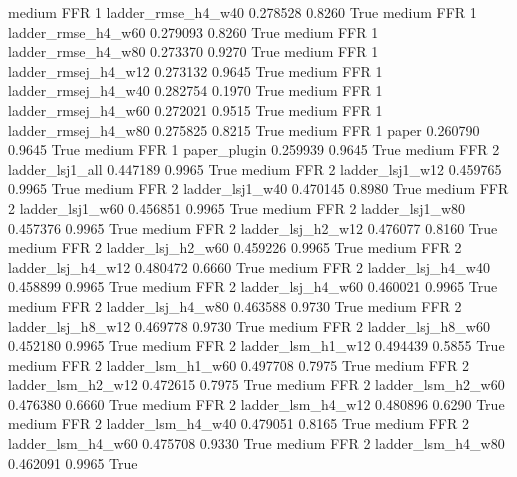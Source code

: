     medium      FFR                 1  ladder_rmse_h4_w40   0.278528      0.8260    True
    medium      FFR                 1  ladder_rmse_h4_w60   0.279093      0.8260    True
    medium      FFR                 1  ladder_rmse_h4_w80   0.273370      0.9270    True
    medium      FFR                 1 ladder_rmsej_h4_w12   0.273132      0.9645    True
    medium      FFR                 1 ladder_rmsej_h4_w40   0.282754      0.1970    True
    medium      FFR                 1 ladder_rmsej_h4_w60   0.272021      0.9515    True
    medium      FFR                 1 ladder_rmsej_h4_w80   0.275825      0.8215    True
    medium      FFR                 1               paper   0.260790      0.9645    True
    medium      FFR                 1        paper_plugin   0.259939      0.9645    True
    medium      FFR                 2     ladder_lsj1_all   0.447189      0.9965    True
    medium      FFR                 2     ladder_lsj1_w12   0.459765      0.9965    True
    medium      FFR                 2     ladder_lsj1_w40   0.470145      0.8980    True
    medium      FFR                 2     ladder_lsj1_w60   0.456851      0.9965    True
    medium      FFR                 2     ladder_lsj1_w80   0.457376      0.9965    True
    medium      FFR                 2   ladder_lsj_h2_w12   0.476077      0.8160    True
    medium      FFR                 2   ladder_lsj_h2_w60   0.459226      0.9965    True
    medium      FFR                 2   ladder_lsj_h4_w12   0.480472      0.6660    True
    medium      FFR                 2   ladder_lsj_h4_w40   0.458899      0.9965    True
    medium      FFR                 2   ladder_lsj_h4_w60   0.460021      0.9965    True
    medium      FFR                 2   ladder_lsj_h4_w80   0.463588      0.9730    True
    medium      FFR                 2   ladder_lsj_h8_w12   0.469778      0.9730    True
    medium      FFR                 2   ladder_lsj_h8_w60   0.452180      0.9965    True
    medium      FFR                 2   ladder_lsm_h1_w12   0.494439      0.5855    True
    medium      FFR                 2   ladder_lsm_h1_w60   0.497708      0.7975    True
    medium      FFR                 2   ladder_lsm_h2_w12   0.472615      0.7975    True
    medium      FFR                 2   ladder_lsm_h2_w60   0.476380      0.6660    True
    medium      FFR                 2   ladder_lsm_h4_w12   0.480896      0.6290    True
    medium      FFR                 2   ladder_lsm_h4_w40   0.479051      0.8165    True
    medium      FFR                 2   ladder_lsm_h4_w60   0.475708      0.9330    True
    medium      FFR                 2   ladder_lsm_h4_w80   0.462091      0.9965    True
